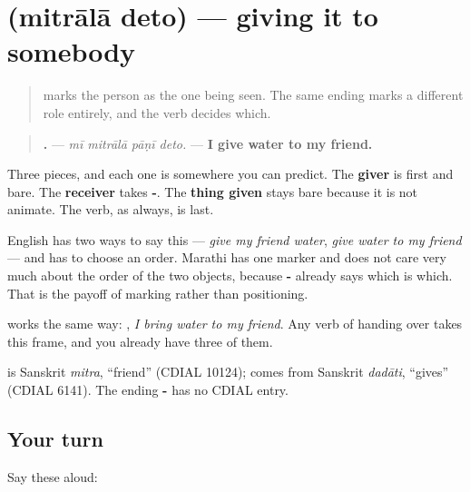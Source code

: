 \section[\texorpdfstring{\mr{मित्राला} \mr{देतो} (mitrālā deto)}{मित्राला देतो (mitrālā deto)}]{  (mitrālā deto) — giving it to somebody}

\label{lesson:MR-C47-laa-recipient}



\begin{quote}
\textbf{ } marks the person as the one being seen. The same ending marks a different role entirely, and the verb decides which.
\end{quote}

\begin{grammarlens}[title={Grammar Lens: the thing stays bare, the person takes -\mr{ला}}]
\begin{quote}
\textbf{   .} — \emph{mī mitrālā pāṇī deto.} — \textbf{I give water to my friend.}
\end{quote}

Three pieces, and each one is somewhere you can predict. The \textbf{giver} is first and bare. The \textbf{receiver} takes \textbf{-}. The \textbf{thing given} stays bare because it is not animate. The verb, as always, is last.

English has two ways to say this — \emph{give my friend water}, \emph{give water to my friend} — and has to choose an order. Marathi has one marker and does not care very much about the order of the two objects, because \textbf{-} already says which is which. That is the payoff of marking rather than positioning.

\textbf{} works the same way: \textbf{   }, \emph{I bring water to my friend}. Any verb of handing over takes this frame, and you already have three of them.
\end{grammarlens}

\begin{cousinweb}
\textbf{} is Sanskrit \emph{mitra}, \textquotedblleft{}friend\textquotedblright{} (CDIAL 10124); \textbf{} comes from Sanskrit \emph{dadāti}, \textquotedblleft{}gives\textquotedblright{} (CDIAL 6141). The ending \textbf{-} has no CDIAL entry.
\end{cousinweb}

\subsection*{Your turn}
Say these aloud:

